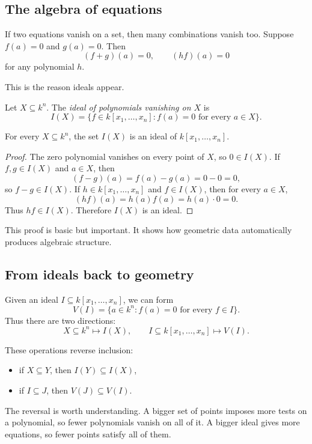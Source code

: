 \subsection{The algebra of equations}

If two equations vanish on a set, then many combinations vanish too. Suppose
$f(a)=0$ and $g(a)=0$. Then
\[
(f+g)(a)=0,\qquad (hf)(a)=0
\]
for any polynomial $h$.

This is the reason ideals appear.

\begin{definition}
Let $X\subseteq k^n$. The \emph{ideal of polynomials vanishing on $X$} is
\[
I(X)=\{f\in k[x_1,\ldots,x_n]:f(a)=0\text{ for every }a\in X\}.
\]
\end{definition}

\begin{theorem}
For every $X\subseteq k^n$, the set $I(X)$ is an ideal of
$k[x_1,\ldots,x_n]$.
\end{theorem}

\begin{proof}
The zero polynomial vanishes on every point of $X$, so $0\in I(X)$. If
$f,g\in I(X)$ and $a\in X$, then
\[
(f-g)(a)=f(a)-g(a)=0-0=0,
\]
so $f-g\in I(X)$. If $h\in k[x_1,\ldots,x_n]$ and $f\in I(X)$, then for
every $a\in X$,
\[
(hf)(a)=h(a)f(a)=h(a)\cdot 0=0.
\]
Thus $hf\in I(X)$. Therefore $I(X)$ is an ideal.
\end{proof}

This proof is basic but important. It shows how geometric data automatically
produces algebraic structure.

\subsection{From ideals back to geometry}

Given an ideal $I\subseteq k[x_1,\ldots,x_n]$, we can form
\[
V(I)=\{a\in k^n:f(a)=0\text{ for every }f\in I\}.
\]
Thus there are two directions:
\[
X\subseteq k^n \mapsto I(X),
\qquad
I\subseteq k[x_1,\ldots,x_n]\mapsto V(I).
\]

These operations reverse inclusion:

\begin{itemize}
\item if $X\subseteq Y$, then $I(Y)\subseteq I(X)$,
\item if $I\subseteq J$, then $V(J)\subseteq V(I)$.
\end{itemize}

The reversal is worth understanding. A bigger set of points imposes more tests
on a polynomial, so fewer polynomials vanish on all of it. A bigger ideal gives
more equations, so fewer points satisfy all of them.

